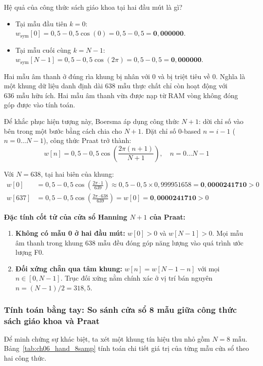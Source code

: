 Hệ quả của công thức sách giáo khoa tại hai đầu mút là gì?
\begin{itemize}[leftmargin=1.5em, itemsep=2pt]
    \item Tại mẫu đầu tiên $k = 0$: $w_{\text{sym}}[0] = 0{,}5 - 0{,}5 \cos(0) = 0{,}5 - 0{,}5 = \mathbf{0{,}000000}$.
    \item Tại mẫu cuối cùng $k = N-1$: $w_{\text{sym}}[N-1] = 0{,}5 - 0{,}5 \cos(2\pi) = 0{,}5 - 0{,}5 = \mathbf{0{,}000000}$.
\end{itemize}

Hai mẫu âm thanh ở đúng rìa khung bị nhân với $0$ và bị triệt tiêu về $0$. Nghĩa là một khung dữ liệu danh định dài $638\text{ mẫu}$ thực chất chỉ còn hoạt động với $636\text{ mẫu}$ hữu ích. Hai mẫu âm thanh vừa được nạp từ RAM vòng không đóng góp được vào tính toán.

Để khắc phục hiện tượng này, Boersma áp dụng công thức $N+1$: dời chỉ số vào bên trong một bước bằng cách chia cho $N+1$. Đặt chỉ số $0$-based $n = i - 1$ ($n = 0 \dots N-1$), công thức Praat trở thành:
\begin{equation}
w[n] = 0{,}5 - 0{,}5 \cos\left( \frac{2\pi (n + 1)}{N + 1} \right), \quad n = 0 \dots N-1
\end{equation}

Với $N = 638$, tại hai biên của khung:
\begin{align}
w[0] &= 0{,}5 - 0{,}5 \cos\left( \frac{2\pi \cdot 1}{639} \right) \approx 0{,}5 - 0{,}5 \times 0{,}999951658 = \mathbf{0{,}0000241710} > 0 \\
w[637] &= 0{,}5 - 0{,}5 \cos\left( \frac{2\pi \cdot 638}{639} \right) = w[0] = \mathbf{0{,}0000241710} > 0
\end{align}

\begin{equationcard}
\textbf{Đặc tính cốt tử của cửa sổ Hanning $N+1$ của Praat:}
\begin{enumerate}
    \item \textbf{Không có mẫu 0 ở hai đầu mút:} $w[0] > 0$ và $w[N-1] > 0$. Mọi mẫu âm thanh trong khung $638\text{ mẫu}$ đều đóng góp năng lượng vào quá trình ước lượng F0.
    \item \textbf{Đối xứng chẵn qua tâm khung:} $w[n] = w[N - 1 - n]$ với mọi $n \in [0, N-1]$. Trục đối xứng nằm chính xác ở vị trí bán nguyên $n = (N - 1)/2 = 318{,}5$.
\end{enumerate}
\end{equationcard}

\subsubsection*{Tính toán bằng tay: So sánh cửa sổ 8 mẫu giữa công thức sách giáo khoa và Praat}
Để minh chứng sự khác biệt, ta xét một khung tín hiệu thu nhỏ gồm $N = 8\text{ mẫu}$. Bảng~\ref{tab:ch06_hand_8samp} tính toán chi tiết giá trị của từng mẫu cửa sổ theo hai công thức.

